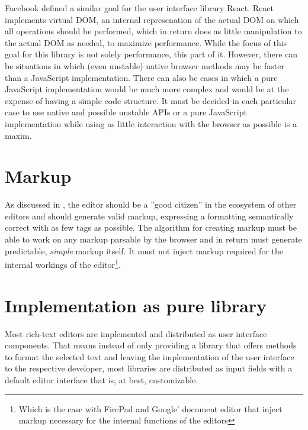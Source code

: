 Facebook defined a similar goal for the user interface library React. React implements virtual DOM, an internal represenation of the actual DOM on which all operations should be performed, which in return does as little manipulation to the actual DOM as needed, to maximize performance. While the focus of this goal for this library is not solely performance, this part of it. However, there can be situations in which (even unstable) native browser methods may be faster than a JavaScript implementation. There can also be cases in which a pure JavaScript implementation would be much more complex and would be at the expense of having a simple code structure. It must be decided in each particular case to use native and possible unstable APIs or a pure JavaScript implementation while using as little interaction with the browser as possible is a maxim.



\section{Markup} 

As discussed in , the editor should be a ''good citizen'' in the ecosystem of other editors and should generate valid markup, expressing a formatting semantically correct with as few tags as possible. The algorithm for creating markup must be able to work on any markup parsable by the browser and in return must generate predictable, \textit{simple} markup itself. It must not inject markup required for the internal workings of the editor\footnote{Which is the case with FirePad and Google' document editor that inject markup necessary for the internal functions of the editors}.



\section{Implementation as pure library}

Most rich-text editors are implemented and distributed as user interface components. That means instead of only providing a library that offers methods to format the selected text and leaving the implementation of the user interface to the respective developer, most libraries are distributed as input fields with a default editor interface that is, at best, customizable.

